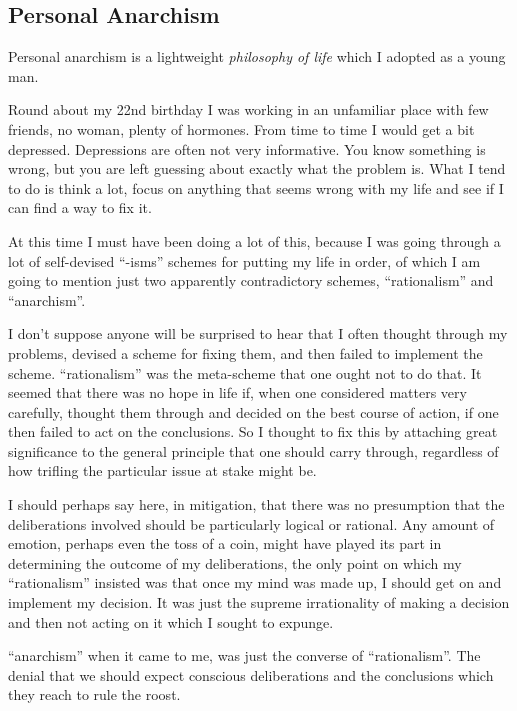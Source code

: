 \subsection{Personal Anarchism}\label{Personal}

Personal anarchism is a lightweight {\it philosophy of life} which I adopted as a young man.

Round about my 22nd birthday I was working in an unfamiliar place with few friends, no woman, plenty of hormones.
From time to time I would get a bit depressed.
Depressions are often not very informative.
You know something is wrong, but you are left guessing about exactly what the problem is.
What I tend to do is think a lot, focus on anything that seems wrong with my life and see if I can find a way to fix it.

At this time I must have been doing a lot of this, because I was going through a lot of self-devised ``-isms'' schemes for putting my life in order, of which I am going to mention just two apparently contradictory schemes, ``rationalism'' and ``anarchism''.

I don't suppose anyone will be surprised to hear that I often thought through my problems, devised a scheme for fixing them, and then failed to implement the scheme.
``rationalism'' was the meta-scheme that one ought not to do that.
It seemed that there was no hope in life if, when one considered matters very carefully, thought them through and decided on the best course of action, if one then failed to act on the conclusions.
So I thought to fix this by attaching great significance to the general principle that one should carry through, regardless of how trifling the particular issue at stake might be.

I should perhaps say here, in mitigation, that there was no presumption that the deliberations involved should be particularly logical or rational.
Any amount of emotion, perhaps even the toss of a coin, might have played its part in determining the outcome of my deliberations, the only point on which my ``rationalism'' insisted was that once my mind was made up, I should get on and implement my decision.
It was just the supreme irrationality of making a decision and then not acting on it which I sought to expunge.

``anarchism'' when it came to me, was just the converse of ``rationalism''.
The denial that we should expect conscious deliberations and the conclusions which they reach to rule the roost.

